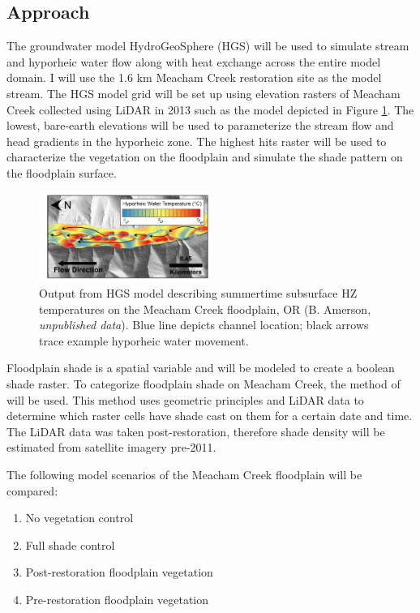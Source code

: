 \documentclass[a4paper]{article}
\begin{document}
\subsection*{Approach}
The groundwater model HydroGeoSphere (HGS) will be used to simulate stream and hyporheic water flow along with heat exchange across the entire model domain. I will use the 1.6 km Meacham Creek restoration site as the model stream. The HGS model grid will be set up using elevation rasters of Meacham Creek collected using LiDAR in 2013 such as the model depicted in Figure \ref{fig:Three}. The lowest, bare-earth elevations will be used to parameterize the stream flow and head gradients in the hyporheic zone. The highest hits raster will be used to characterize the vegetation on the floodplain and simulate the shade pattern on the floodplain surface. 

\begin{figure}
\centering
\includegraphics[width=0.5\textwidth]{HyporheicModel.png}
\caption{\label{fig:Three} Output from HGS model describing summertime subsurface HZ temperatures on the Meacham Creek floodplain, OR (B. Amerson, \textit{unpublished data}). Blue line depicts channel location; black arrows trace example hyporheic water movement.}
\end{figure}


Floodplain shade is a spatial variable and will be modeled to create a boolean shade raster. To categorize floodplain shade on Meacham Creek, the method of \cite{Loicq2018ImprovingData} will be used. This method uses geometric principles and LiDAR data to determine which raster cells have shade cast on them for a certain date and time. The LiDAR data was taken post-restoration, therefore shade density will be estimated from satellite imagery pre-2011.

The following model scenarios of the Meacham Creek floodplain will be compared: 
\begin{enumerate}
    \item No vegetation control
    \item Full shade control
    \item Post-restoration floodplain vegetation
    \item Pre-restoration floodplain vegetation
\end{enumerate}
\end{document}
